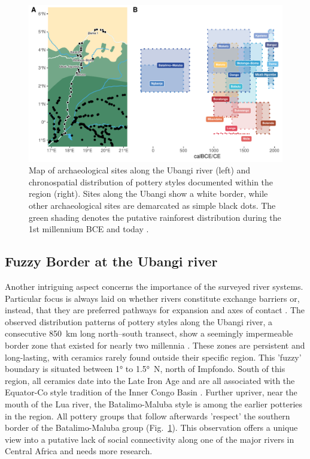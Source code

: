 \documentclass[smallextended,natbib]{svjour3}       %
\begin{document}
\begin{figure}[!tbp]
	\centering
	\includegraphics[width=\textwidth]{fig_ubangi_chrono.pdf}
	\caption{Map of archaeological sites along the Ubangi river (left) and chronospatial distribution of pottery styles documented within the region (right). Sites along the Ubangi show a white border, while other archaeological sites are demarcated as simple black dots. The green shading denotes the putative rainforest distribution during the 1st millennium BCE \citep[dark green;][]{Bremond.2017,Maley.2017} and today \citep[light green;][]{White.1983}.}
	\label{fig:ubangi.chrono}
\end{figure}

\subsection*{Fuzzy Border at the Ubangi river}

Another intriguing aspect concerns the importance of the surveyed river systems. Particular focus is always laid on whether rivers constitute exchange barriers or, instead, that they are preferred pathways for expansion and axes of contact \citep{Russell.2014}. The observed distribution patterns of pottery styles along the Ubangi river, a consecutive 850~km long north--south transect, show a seemingly impermeable border zone that existed for nearly two millennia \citep[Fig.~\ref{fig:ubangi.chrono};][183--185, 184 Tab.~17]{Seidensticker.2021e}. These zones are persistent and long-lasting, with ceramics rarely found outside their specific region. This 'fuzzy' boundary is situated between 1° to 1.5°~N, north of Impfondo. South of this region, all ceramics date into the Late Iron Age and are all associated with the Equator-Co style tradition of the Inner Congo Basin \citep{Wotzka.1995}. Further upriver, near the mouth of the Lua river, the Batalimo-Maluba style is among the earlier potteries in the region. All pottery groups that follow afterwards 'respect' the southern border of the Batalimo-Maluba group (Fig.~\ref{fig:ubangi.chrono}). This observation offers a unique view into a putative lack of social connectivity along one of the major rivers in Central Africa and needs more research.
\end{document}
